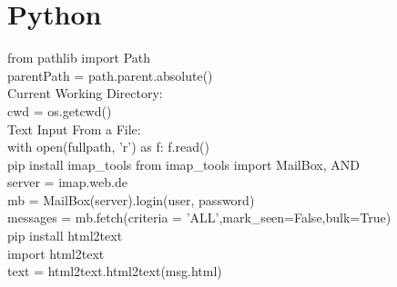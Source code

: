 \chapter{Python}\label{chap:Python}
from pathlib import Path\\
parentPath = path.parent.absolute()\\
Current Working Directory:\\
cwd = os.getcwd()\\
Text Input From a File:\\
with open(fullpath, 'r') as f:
f.read()\\


pip install imap\_tools
from imap\_tools import MailBox, AND\\
server = imap.web.de\\
mb = MailBox(server).login(user, password)\\
messages = mb.fetch(criteria = 'ALL',mark_seen=False,bulk=True)\\
\smallskip
pip install html2text\\
import html2text\\
text = html2text.html2text(msg.html)\\